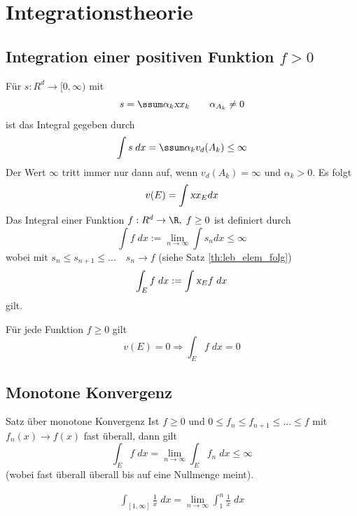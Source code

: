 \section{Integrationstheorie}
\subsection{Integration einer positiven Funktion $f > 0$}
	  Für $s: R^d \rightarrow [0,\infty)$ mit 
	  \begin{equation}
	  	s =\ssum \alpha_k \textsl{x}{x}_k \qquad \alpha_{A_k} \neq 0
	  \end{equation}	   
	  ist das Integral gegeben durch
	  \begin{equation}
	  	\int s\; dx = \ssum \alpha_k v_d(A_k) \leq \infty
	  \end{equation}
	  Der Wert $\infty$ tritt immer nur dann auf, wenn $v_d(A_k) = \infty$ und $\alpha_k > 0$. Es folgt
	  \begin{equation}
	  	v(E) = \int \textsl{x}{x}_E dx
	  \end{equation}
	  Das Integral einer Funktion $f:R^d \to \R,\; f \geq 0$ ist definiert durch
	  \begin{equation}
	  	\int f\;dx := \lim_{n \to \infty} \int s_n dx \leq \infty 
	  \end{equation}
	  	wobei mit $s_n \leq s_{n+1} \leq ...  \quad s_n \to f$ (siehe Satz \ref{th:leb_elem_folg}) 
	  \begin{equation}
	   	\int_E f \;dx := \int \textsl{x}_E f \; dx
	  \end{equation}
	   gilt.
	  \begin{satz}
	   	Für jede Funktion $f \geq 0$ gilt
	   	\begin{equation}
	   		v(E) = 0 \Rightarrow \int_E f \; dx = 0
	   	\end{equation}
	   \end{satz}
	   
	   \subsection{Monotone Konvergenz}
	   \begin{satz} Satz über monotone Konvergenz \newline
	   Ist $f \geq 0$ und $0 \leq f_n \leq f_{n+1} \leq ... \leq f$ mit $f_n(x) \to f(x)$ fast überall, dann gilt
	   \begin{equation}
	   	\int_E f \;dx = \lim_{n \to \infty} \int_E f_n \;dx \leq \infty
	   \end{equation}
	   	(wobei fast überall überall bis auf eine Nullmenge meint).
	   \end{satz}
	   \begin{bsp}
	   	\begin{align*}
	   	\int_{[1,\infty]} \frac{1}{x}\; dx = \lim_{n \to \infty} \int_1^n \frac{1}{x} \; dx
	   	\end{align*}
	   \end{bsp}
	  
